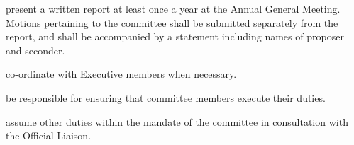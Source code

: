 \begin{longenum}[ label*=\thesubsection.\arabic*., align=left]
    \item present a written report at least once a year at the Annual General Meeting. Motions pertaining to the committee shall be submitted separately from the report, and shall be accompanied by a statement including names of proposer and seconder.
    \item co-ordinate with Executive members when necessary. 
    \item be responsible for ensuring that committee members execute their duties.
    \item assume other duties within the mandate of the committee in consultation with the Official Liaison.
\end{longenum}

